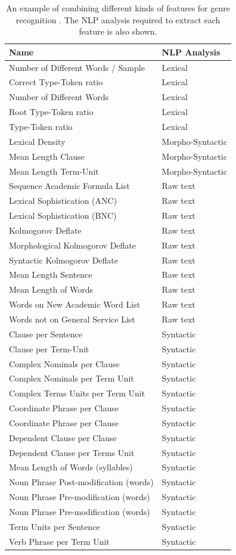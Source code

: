 \begin{table}[t]
	\center
	\caption {An example of combining different kinds of features for genre recognition \parencite{strobel2018text}. The NLP analysis required to extract each feature is also shown.}
	\label{chap:relevant_work:tbl:complexity_measures}
	\begin{tabular}{ll}
		\hline
		Name & NLP Analysis \\
		\hline
		Number of Different Words / Sample & Lexical \\
		Correct Type-Token ratio & Lexical \\
		Number of Different Words & Lexical \\
		Root Type-Token ratio & Lexical \\
		Type-Token ratio & Lexical \\
		Lexical Density & Morpho-Syntactic \\
		Mean Length Clause & Morpho-Syntactic \\
		Mean Length Term-Unit & Morpho-Syntactic \\
		Sequence Academic Formula List & Raw text \\
		Lexical Sophistication (ANC) & Raw text \\
		Lexical Sophistication (BNC) & Raw text \\
		Kolmogorov Deflate & Raw text \\
		Morphological Kolmogorov Deflate & Raw text \\
		Syntactic Kolmogorov Deflate & Raw text \\
		Mean Length Sentence & Raw text \\
		Mean Length of Words & Raw text \\
		Words on New Academic Word List & Raw text \\
		Words not on General Service List & Raw text \\
		Clause per Sentence & Syntactic \\
		Clause per Term-Unit & Syntactic \\
		Complex Nominals per Clause & Syntactic \\
		Complex Nominals per Term Unit & Syntactic \\
		Complex Terms Units per Term Unit & Syntactic \\
		Coordinate Phrase per Clause & Syntactic \\
		Coordinate Phrase per Clause & Syntactic \\
		Dependent Clause per Clause & Syntactic \\
		Dependent Clause per Terms Unit & Syntactic \\
		Mean Length of Words (syllables) & Syntactic \\
		Noun Phrase Post-modification (words) & Syntactic \\
		Noun Phrase Pre-modification (words) & Syntactic \\
		Noun Phrase Pre-modification (words) & Syntactic \\
		Term Units per Sentence & Syntactic \\
		Verb Phrase per Term Unit & Syntactic \\
		\hline
	\end{tabular}
\end{table}


